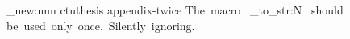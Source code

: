 \msg_new:nnn { ctuthesis } { appendix-twice } { The~macro~ \token_to_str:N \appendix\ should~
	be~used~only~once.~Silently~ignoring. }








\def\@tocrmarg{1em}

\def\ctu@dottedtocline#1#2#3#4#5{\ifnum #1>\c@tocdepth \else
	\addvspace{0pt plus .2pt}
	{
	\leftskip #2\relax
	\rightskip\dimexpr\@tocrmarg plus 1fil
	\parfillskip -\rightskip
	\parindent #3\relax
	\@afterindenttrue
	\interlinepenalty\@M
	\leavevmode
	\null
	\nobreak
	\hskip -\leftskip
	\def\numberline##1{##1\ }
	{#4}
	\nobreak
	\leaders \hbox {$\m@th \mkern 2mu\hbox {.}\mkern 2mu$}\hfill
	\nobreak
	{\kern0.5em#5}
	\par
	}
\fi}

\def\ctu@dottedtoclinebold#1#2#3#4#5{\ifnum #1>\c@tocdepth \else
	\addvspace{0pt plus .2pt}
	{
	\leftskip #2\relax
	\rightskip\dimexpr\@tocrmarg plus 1fil
	\parfillskip -\rightskip
	\parindent #3\relax
	\@afterindenttrue
	\interlinepenalty\@M
	\leavevmode
	\null
	\nobreak
	\hskip -\leftskip
	\def\numberline##1{\sffamily\bfseries##1\ \rmfamily\mdseries\kern0.2em}
	{#4}
	\nobreak
	\leaders \hbox {$\m@th \mkern 2mu\hbox {.}\mkern 2mu$}\hfill
	\nobreak
	{\kern0.5em#5}
	\par
	}
\fi}


